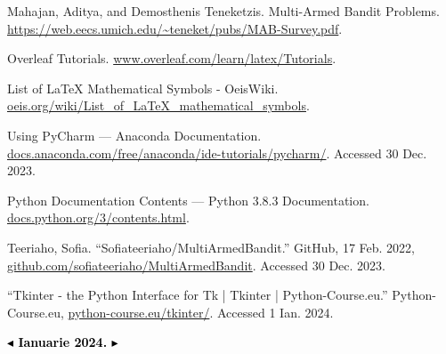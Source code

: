 \documentclass{article}
\begin{document}
\begin{thebibliography}{8}
    Mahajan, Aditya, and Demosthenis Teneketzis. Multi-Armed Bandit Problems.
     {\small  \url{https://web.eecs.umich.edu/~teneket/pubs/MAB-Survey.pdf}}. 
    
     Overleaf Tutorials.   {\small  \url{www.overleaf.com/learn/latex/Tutorials}}. 

    List of LaTeX Mathematical Symbols - OeisWiki.  {\small \url{oeis.org/wiki/List_of_LaTeX_mathematical_symbols}}. 
    
    Using PyCharm — Anaconda Documentation. {\small \url{docs.anaconda.com/free/anaconda/ide-tutorials/pycharm/}}. Accessed 30 Dec. 2023.

    Python Documentation Contents — Python 3.8.3 Documentation. {\small \url{docs.python.org/3/contents.html}}.
    
    Teeriaho, Sofia. “Sofiateeriaho/MultiArmedBandit.” GitHub, 17 Feb. 2022,  {\small \url{github.com/sofiateeriaho/MultiArmedBandit}}. Accessed 30 Dec. 2023. 

   “Tkinter - the Python Interface for Tk | Tkinter | Python-Course.eu.” Python-Course.eu,  {\small \url{python-course.eu/tkinter/}}. Accessed 1 Ian. 2024. 
\end{thebibliography}

\textbf{\large \textcolor{black}{\bfseries{$\blacktriangleleft$}  Ianuarie 2024. $\blacktriangleright$}}
\end{document}
